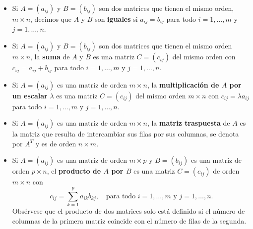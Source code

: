 \documentclass[12pt]{article}
\begin{document}
\begin{itemize}
\item Si $ A = (a_{ij}) $ y $ B = (b_{ij}) $ son dos matrices que tienen el mismo orden, $ m \times n $, decimos que $ A $ y $ B $ son \textbf{iguales} si $ a_{ij} = b_{ij} $ para todo $ i = 1, \ldots, m $ y $ j = 1, \ldots, n $.

\item Si $ A = (a_{ij}) $ y $ B = (b_{ij}) $ son dos matrices que tienen el mismo orden $ m \times n $, la \textbf{suma} de $ A $ y $ B $ es una matriz $ C = (c_{ij}) $ del mismo orden con $ c_{ij} = a_{ij} + b_{ij} $ para todo $ i = 1, \ldots, m $ y $ j = 1, \ldots, n $.

\item Si $ A = (a_{ij}) $ es una matriz de orden $ m \times n $, la \textbf{multiplicación de $ A $ por un escalar} $ \lambda $ es una matriz $ C = (c_{ij}) $ del mismo orden $ m \times n $ con $ c_{ij} = \lambda a_{ij} $ para todo $ i = 1, \ldots, m $ y $ j = 1, \ldots, n $.

\item Si $ A = (a_{ij}) $ es una matriz de orden $ m \times n $, la \textbf{matriz traspuesta} de $ A $ es la matriz que resulta de intercambiar sus filas por sus columnas, se denota por $ A^T $ y es de orden $ n \times m $.

\item Si $ A = (a_{ij}) $ es una matriz de orden $ m \times p $ y $ B = (b_{ij}) $ es una matriz de orden $ p \times n $, el \textbf{producto de $ A $ por $ B $} es una matriz $ C = (c_{ij}) $ de orden $ m \times n $ con $$c_{ij} = \sum_{k=1}^p a_{ik}b_{kj}, \quad \text{para todo } i = 1, \ldots, m \text{ y } j = 1, \ldots, n.$$
Obsérvese que el producto de dos matrices solo está definido si el número de columnas de la primera matriz coincide con el número de filas de la segunda.
\end{itemize}

\end{document}
